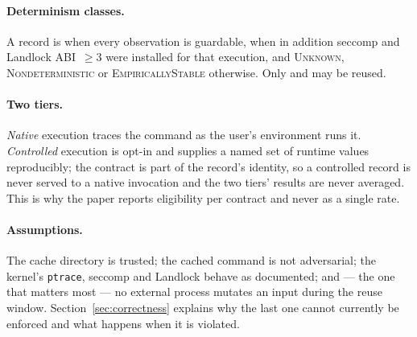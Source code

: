 \paragraph{Determinism classes.}
A record is \guarded{} when every observation is guardable, \proven{} when in addition seccomp and
Landlock ABI~$\geq 3$ were installed for that execution, and \textsc{Unknown},
\textsc{Nondeterministic} or \textsc{EmpiricallyStable} otherwise. Only \guarded{} and \proven{}
may be reused.

\paragraph{Two tiers.}
\emph{Native} execution traces the command as the user's environment runs it. \emph{Controlled}
execution is opt-in and supplies a named set of runtime values reproducibly; the contract is part
of the record's identity, so a controlled record is never served to a native invocation and the
two tiers' results are never averaged. This is why the paper reports eligibility per contract and
never as a single rate.

\paragraph{Assumptions.}
The cache directory is trusted; the cached command is not adversarial; the kernel's
\texttt{ptrace}, seccomp and Landlock behave as documented; and --- the one that matters most ---
no external process mutates an input during the reuse window. Section~\ref{sec:correctness}
explains why the last one cannot currently be enforced and what happens when it is violated.

